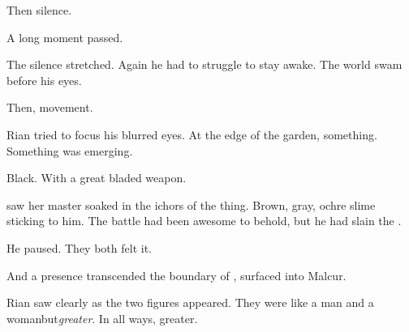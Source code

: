 \begin{garbage}
Then silence. 

A long moment passed. 


The silence stretched. Again he had to struggle to stay awake. The world swam before his eyes. 

Then, movement. 

Rian tried to focus his blurred eyes. At the edge of the garden, something. Something was emerging. 

Black. With a great bladed weapon. 








\begin{comment}
\subsubsection{\Criseis}
\end{comment}
\new
\Criseis{} saw her master soaked in the ichors of the thing. Brown, gray, ochre slime sticking to him. The battle had been awesome to behold, but he had slain the \ghobal. 



He paused. 
They both felt it. 

And a presence transcended the boundary of \Nyx, surfaced into Malcur. 



\begin{comment}
\subsection{A god in the flesh}
\end{comment}

\begin{comment}
\subsubsection{Rian}
\end{comment}
\new
Rian saw clearly as the two figures appeared. 
They were like \humans{}\dash a man and a woman\dash but\prikker \emph{greater}. In all ways, greater. 


\end{garbage}
